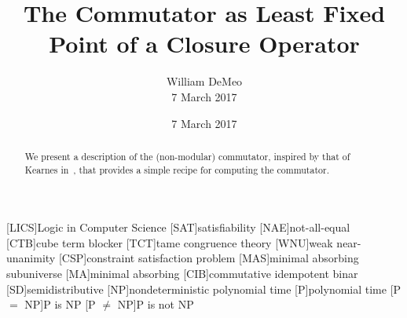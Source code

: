 [LICS]{Logic in Computer Science}
[SAT]{satisfiability}
[NAE]{not-all-equal}
[CTB]{cube term blocker}
[TCT]{tame congruence theory}
[WNU]{weak near-unanimity}
[CSP]{constraint satisfaction problem}
[MAS]{minimal absorbing subuniverse}
[MA]{minimal absorbing}
[CIB]{commutative idempotent binar}
[SD]{semidistributive}
[NP]{nondeterministic polynomial time}
[P]{polynomial time}
[P $ = $ NP]{P is NP}
[P $ \neq $ NP]{P is not NP}





\usepackage{inputs/macros}



\title[Commutator as a Least Fixed Point]{%
  The Commutator as Least Fixed Point of a Closure Operator}
\date{7 March 2017}
\author[William DeMeo]{William DeMeo\\
7 March 2017}
\address{University of Hawaii, Honolulu 96822}
\address{e-mail: \href{mailto:williamdemeo@gmail.com}{williamdemeo@gmail.com}}

\begin{abstract}
  We present a description of the (non-modular) commutator, inspired by that of
  Kearnes in~\cite[p.~930]{MR1358491}, that provides a simple recipe for computing
  the commutator. 
\end{abstract}

\maketitle

\newcommand\mytimes{\ensuremath{\ast}}
